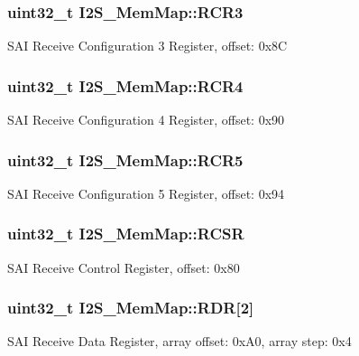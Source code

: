 \subsubsection[{R\+C\+R3}]{\setlength{\rightskip}{0pt plus 5cm}uint32\+\_\+t I2\+S\+\_\+\+Mem\+Map\+::\+R\+C\+R3}\label{struct_i2_s___mem_map_ae96e284d7e6ec36cb87d0431588c489d}
S\+A\+I Receive Configuration 3 Register, offset\+: 0x8\+C \hypertarget{struct_i2_s___mem_map_af6f0d11fd84c4cb0be68adb569f3f578}{}
\subsubsection[{R\+C\+R4}]{\setlength{\rightskip}{0pt plus 5cm}uint32\+\_\+t I2\+S\+\_\+\+Mem\+Map\+::\+R\+C\+R4}\label{struct_i2_s___mem_map_af6f0d11fd84c4cb0be68adb569f3f578}
S\+A\+I Receive Configuration 4 Register, offset\+: 0x90 \hypertarget{struct_i2_s___mem_map_ada5677c98d1cf918e91389e40256159a}{}
\subsubsection[{R\+C\+R5}]{\setlength{\rightskip}{0pt plus 5cm}uint32\+\_\+t I2\+S\+\_\+\+Mem\+Map\+::\+R\+C\+R5}\label{struct_i2_s___mem_map_ada5677c98d1cf918e91389e40256159a}
S\+A\+I Receive Configuration 5 Register, offset\+: 0x94 \hypertarget{struct_i2_s___mem_map_adf26fb4a1039d9061d9a23093e1624f5}{}
\subsubsection[{R\+C\+S\+R}]{\setlength{\rightskip}{0pt plus 5cm}uint32\+\_\+t I2\+S\+\_\+\+Mem\+Map\+::\+R\+C\+S\+R}\label{struct_i2_s___mem_map_adf26fb4a1039d9061d9a23093e1624f5}
S\+A\+I Receive Control Register, offset\+: 0x80 \hypertarget{struct_i2_s___mem_map_a4bc0643c4d11f8c3db6275fdcc118d05}{}
\subsubsection[{R\+D\+R}]{\setlength{\rightskip}{0pt plus 5cm}uint32\+\_\+t I2\+S\+\_\+\+Mem\+Map\+::\+R\+D\+R\mbox{[}2\mbox{]}}\label{struct_i2_s___mem_map_a4bc0643c4d11f8c3db6275fdcc118d05}
S\+A\+I Receive Data Register, array offset\+: 0x\+A0, array step\+: 0x4 \hypertarget{struct_i2_s___mem_map_ac7142d72a5d91e4b1b086c037d514559}{}

